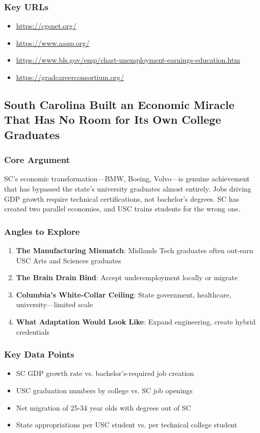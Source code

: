 \documentclass[11pt,letterpaper]{article}
\begin{document}
\subsubsection*{Key URLs}
\begin{itemize}[noitemsep]
    \item \url{https://cgsnet.org/}
    \item \url{https://www.aaup.org/}
    \item \url{https://www.bls.gov/emp/chart-unemployment-earnings-education.htm}
    \item \url{https://gradcareerconsortium.org/}
\end{itemize}

\newpage
\subsection{South Carolina Built an Economic Miracle That Has No Room for Its Own College Graduates}

\subsubsection*{Core Argument}
SC's economic transformation---BMW, Boeing, Volvo---is genuine achievement that has bypassed the state's university graduates almost entirely. Jobs driving GDP growth require technical certifications, not bachelor's degrees. SC has created two parallel economies, and USC trains students for the wrong one.

\subsubsection*{Angles to Explore}
\begin{enumerate}[noitemsep]
    \item \textbf{The Manufacturing Mismatch}: Midlands Tech graduates often out-earn USC Arts and Sciences graduates
    \item \textbf{The Brain Drain Bind}: Accept underemployment locally or migrate
    \item \textbf{Columbia's White-Collar Ceiling}: State government, healthcare, university---limited scale
    \item \textbf{What Adaptation Would Look Like}: Expand engineering, create hybrid credentials
\end{enumerate}

\subsubsection*{Key Data Points}
\begin{itemize}[noitemsep]
    \item SC GDP growth rate vs. bachelor's-required job creation
    \item USC graduation numbers by college vs. SC job openings
    \item Net migration of 25-34 year olds with degrees out of SC
    \item State appropriations per USC student vs. per technical college student
\end{itemize}
\end{document}
